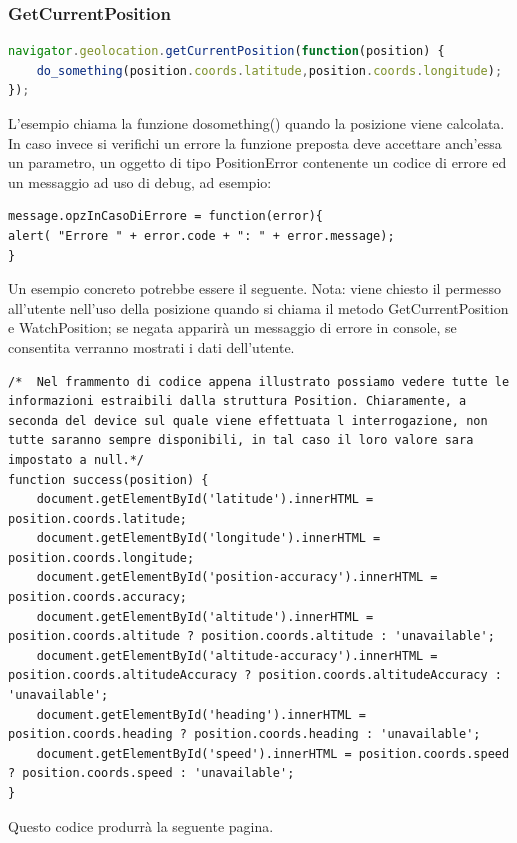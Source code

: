 \documentclass[11pt ,a4paper , twoside , openright ]{article}
\begin{document}
\subsubsection{GetCurrentPosition}
\begin{lstlisting}[language=JavaScript]
navigator.geolocation.getCurrentPosition(function(position) {
	do_something(position.coords.latitude,position.coords.longitude);
});
\end{lstlisting}
L'esempio chiama la funzione dosomething() quando la posizione viene calcolata. 
\\
In caso invece si verifichi un errore la funzione preposta deve accettare anch’essa un parametro, un oggetto di tipo PositionError  contenente un codice di errore ed un messaggio ad uso di debug, ad esempio:
\begin{lstlisting}
message.opzInCasoDiErrore = function(error){ 
alert( "Errore " + error.code + ": " + error.message);
}
\end{lstlisting}
Un esempio concreto potrebbe essere il seguente. 
Nota: viene chiesto il permesso all'utente nell'uso della posizione quando si chiama il metodo GetCurrentPosition e WatchPosition; se negata apparirà un messaggio di errore in console, se consentita verranno mostrati i dati dell'utente.
\begin{lstlisting}
/*	Nel frammento di codice appena illustrato possiamo vedere tutte le informazioni estraibili dalla struttura Position. Chiaramente, a seconda del device sul quale viene effettuata l interrogazione, non tutte saranno sempre disponibili, in tal caso il loro valore sara impostato a null.*/
function success(position) {
	document.getElementById('latitude').innerHTML = position.coords.latitude;
	document.getElementById('longitude').innerHTML = position.coords.longitude;
	document.getElementById('position-accuracy').innerHTML = position.coords.accuracy;	
	document.getElementById('altitude').innerHTML = position.coords.altitude ? position.coords.altitude : 'unavailable';
	document.getElementById('altitude-accuracy').innerHTML = position.coords.altitudeAccuracy ? position.coords.altitudeAccuracy : 'unavailable';
	document.getElementById('heading').innerHTML = position.coords.heading ? position.coords.heading : 'unavailable';
	document.getElementById('speed').innerHTML = position.coords.speed ? position.coords.speed : 'unavailable';
}
\end{lstlisting}
Questo codice produrrà la seguente pagina.
\\
\end{document}

